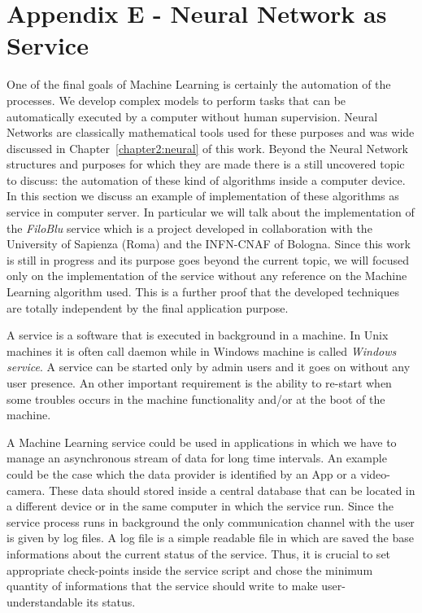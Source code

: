 \documentclass{standalone}
\begin{document}
\chapter*{Appendix E - Neural Network as Service}

One of the final goals of Machine Learning is certainly the automation of the processes.
We develop complex models to perform tasks that can be automatically executed by a computer without human supervision.
Neural Networks are classically mathematical tools used for these purposes and was wide discussed in Chapter~\ref{chapter2:neural} of this work.
Beyond the Neural Network structures and purposes for which they are made there is a still uncovered topic to discuss: the automation of these kind of algorithms inside a computer device.
In this section we discuss an example of implementation of these algorithms as service in computer server.
In particular we will talk about the implementation of the \emph{FiloBlu} service which is a project developed in collaboration with the University of Sapienza (Roma) and the INFN-CNAF of Bologna.
Since this work is still in progress and its purpose goes beyond the current topic, we will focused only on the implementation of the service without any reference on the Machine Learning algorithm used.
This is a further proof that the developed techniques are totally independent by the final application purpose.

A service is a software that is executed in background in a machine.
In Unix machines it is often call \textsf{daemon} while in Windows machine is called \emph{Windows service}.
A service can be started only by admin users and it goes on without any user presence.
An other important requirement is the ability to re-start when some troubles occurs in the machine functionality and/or at the boot of the machine.

A Machine Learning service could be used in applications in which we have to manage an asynchronous stream of data for long time intervals.
An example could be the case which the data provider is identified by an App or a video-camera.
These data should stored inside a central database that can be located in a different device or in the same computer in which the service run.
Since the service process runs in background the only communication channel with the user is given by log files.
A log file is a simple readable file in which are saved the base informations about the current status of the service.
Thus, it is crucial to set appropriate check-points inside the service script and chose the minimum quantity of informations that the service should write to make user-understandable its status.
\end{document}
